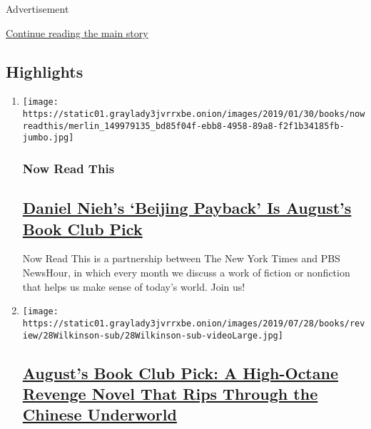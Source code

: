 Advertisement

\protect\hyperlink{after-subheader}{Continue reading the main story}

\hypertarget{highlights}{%
\subsection{Highlights}\label{highlights}}

\begin{enumerate}
\def\labelenumi{\arabic{enumi}.}
\item
  \texttt{[image: https://static01.graylady3jvrrxbe.onion/images/2019/01/30/books/nowreadthis/merlin\_149979135\_bd85f04f-ebb8-4958-89a8-f2f1b34185fb-jumbo.jpg]}

  \hypertarget{now-read-this-1}{%
  \subsubsection{Now Read This}\label{now-read-this-1}}

  \hypertarget{daniel-niehs-beijing-payback-is-augusts-book-club-pick}{%
  \subsection{\texorpdfstring{\href{/2018/01/09/books/now-read-this.html}{Daniel
  Nieh's `Beijing Payback' Is August's Book Club
  Pick}}{Daniel Nieh's `Beijing Payback' Is August's Book Club Pick}}\label{daniel-niehs-beijing-payback-is-augusts-book-club-pick}}

  Now Read This is a partnership between The New York Times and PBS
  NewsHour, in which every month we discuss a work of fiction or
  nonfiction that helps us make sense of today's world. Join us!
\item
  \texttt{[image: https://static01.graylady3jvrrxbe.onion/images/2019/07/28/books/review/28Wilkinson-sub/28Wilkinson-sub-videoLarge.jpg]}

  \hypertarget{augusts-book-club-pick-a-high-octane-revenge-novel-that-rips-through-the-chinese-underworld}{%
  \subsection{\texorpdfstring{\href{/2019/07/22/books/review/beijing-payback-daniel-nieh.html}{August's
  Book Club Pick: A High-Octane Revenge Novel That Rips Through the
  Chinese
  Underworld}}{August's Book Club Pick: A High-Octane Revenge Novel That Rips Through the Chinese Underworld}}\label{augusts-book-club-pick-a-high-octane-revenge-novel-that-rips-through-the-chinese-underworld}}


\end{enumerate}
